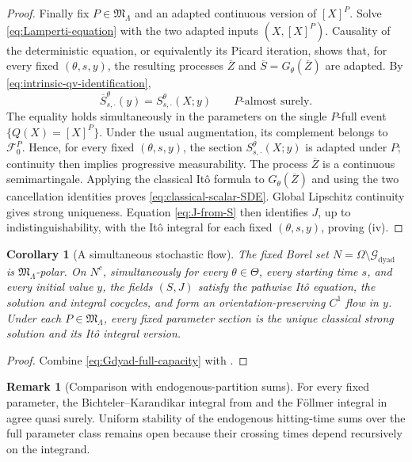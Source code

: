 \documentclass[11pt,reqno]{amsart}
\theoremstyle{plain}
\newtheorem{corollary}[corollary]{Corollary}
\theoremstyle{definition}
\newtheorem{remark}[remark]{Remark}
\newcommand{\cF}{\mathcal F}
\newcommand{\cG}{\mathcal G}
\begin{document}
\begin{proof}
Finally fix \(P\in\mathfrak M_\Lambda\) and an adapted continuous version of
\([X]^P\).  Solve \eqref{eq:Lamperti-equation} with the two adapted inputs
\((X,[X]^P)\).  Causality of the deterministic equation, or equivalently its
Picard iteration, shows that, for every fixed \((\theta,s,y)\), the resulting
processes \(\overline Z\) and \(\overline S=G_\theta(\overline Z)\) are
adapted.  By
\eqref{eq:intrinsic-qv-identification},
\[
  \overline S_{s,\cdot}^\theta(y)
  =S_{s,\cdot}^\theta(X;y)
  \qquad P\text{-almost surely}.
\]
The equality holds simultaneously in the parameters on the single
\(P\)-full event \(\{Q(X)=[X]^P\}\).  Under the usual augmentation, its
complement belongs to \(\cF_0^P\).  Hence, for every fixed \((\theta,s,y)\),
the section \(S_{s,\cdot}^\theta(X;y)\) is adapted under \(P\); continuity
then implies progressive measurability.  The process
\(\overline Z\) is a continuous semimartingale.  Applying the classical
It\^o formula to \(G_\theta(\overline Z)\) and using the two cancellation
identities proves \eqref{eq:classical-scalar-SDE}.  Global Lipschitz
continuity gives strong uniqueness.  Equation \eqref{eq:J-from-S} then
identifies \(J\), up to indistinguishability, with the It\^o integral for each
fixed \((\theta,s,y)\), proving (iv).
\end{proof}

\begin{corollary}[A simultaneous stochastic flow]
\label{cor:simultaneous-stochastic-flow}
The fixed Borel set
\(N=\Omega\setminus\cG_{\mathrm{dyad}}\) is
\(\mathfrak M_\Lambda\)-polar.  On \(N^c\), simultaneously for every
\(\theta\in\Theta\), every starting time \(s\), and every initial value
\(y\), the fields \((S,J)\) satisfy the pathwise It\^o equation, the solution
and integral cocycles, and form an orientation-preserving \(C^1\) flow in
\(y\).  Under each \(P\in\mathfrak M_\Lambda\), every fixed parameter section is the
unique classical strong solution and its It\^o integral version.
\end{corollary}

\begin{proof}
Combine \eqref{eq:Gdyad-full-capacity} with
.
\end{proof}

\begin{remark}[Comparison with endogenous-partition sums]
For every fixed parameter, the Bichteler--Karandikar integral from
 and the F\"ollmer integral in
 agree quasi surely.  Uniform stability of the
endogenous hitting-time sums over the full parameter class remains open
because their crossing times depend recursively on the integrand.
\end{remark}
\end{document}
